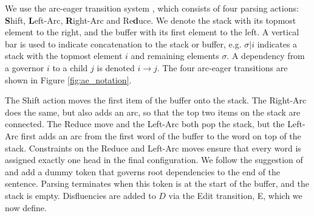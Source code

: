 \documentclass[11pt,letterpaper]{article}
\begin{document}
We use the arc-eager transition system \citep{nivre:03,nivre:cl}, which consists
of four parsing actions:  \textbf{S}hift, \textbf{L}eft-Arc,
\textbf{R}ight-Arc and Re\textbf{d}uce.
We denote the stack with its topmost element
to the right, and the buffer with its first element to the left. A vertical bar
is used to indicate concatenation to the stack or buffer, e.g. $\sigma | i$ indicates
a stack with the topmost element $i$ and remaining elements $\sigma$.  
A dependency from a governor $i$ to a child $j$ is denoted $i \rightarrow j$.
The four arc-eager transitions are shown in Figure \ref{fig:ae_notation}.

The Shift action moves the first item of the buffer onto the stack.
The Right-Arc does the same, but also adds an arc, so that the top two items
on the stack are connected. The Reduce move and the Left-Arc both pop the stack,
but the Left-Arc first adds an arc from the first word of the buffer to the word
on top of the stack. Constraints on the Reduce and Left-Arc
moves ensure that every word is assigned exactly one head in the final configuration.
We follow the suggestion of \citet{nivre:squib} and
add a dummy token that governs root dependencies to the end of the sentence.
Parsing terminates when this token is at the start of the buffer, and the stack is empty.
Disfluencies are added to $D$ via the Edit transition, E, which we now define.
\end{document}
